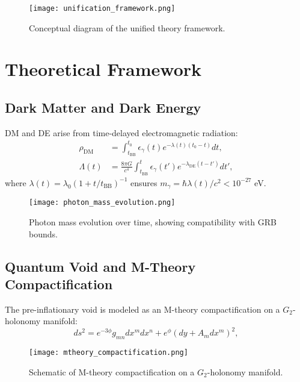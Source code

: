 \documentclass[12pt, a4paper]{article}
\begin{document}
\begin{figure}[h]
\centering
\texttt{[image: unification\_framework.png]}
\caption{Conceptual diagram of the unified theory framework.}
\label{fig:framework}
\end{figure}

\section{Theoretical Framework}

\subsection{Dark Matter and Dark Energy}

DM and DE arise from time-delayed electromagnetic radiation:
\begin{align}
\rho_{\text{DM}} &= \int_{t_{\text{BB}}}^{t_0} \epsilon_{\gamma}(t) e^{-\lambda(t)(t_0 - t)} dt, \label{eq:dm} \\
\Lambda(t) &= \frac{8\pi G}{c^4} \int_{t_{\text{BB}}}^{t} \epsilon_{\gamma}(t') e^{-\lambda_{\text{DE}}(t - t')} dt', \label{eq:de}
\end{align}
where \(\lambda(t) = \lambda_0 \left(1 + t/t_{\text{BB}}\right)^{-1}\) ensures \(m_\gamma = \hbar \lambda(t)/c^2 < 10^{-27}\) eV.

\begin{figure}[h]
\centering
\texttt{[image: photon\_mass\_evolution.png]}
\caption{Photon mass evolution over time, showing compatibility with GRB bounds.}
\label{fig:photon_mass}
\end{figure}

\subsection{Quantum Void and M-Theory Compactification}

The pre-inflationary void is modeled as an M-theory compactification on a \(G_2\)-holonomy manifold:
\begin{equation}
ds^2 = e^{-3\phi} g_{mn} dx^m dx^n + e^{\phi} (dy + A_m dx^m)^2, \label{eq:G2}
\end{equation}

\begin{figure}[h]
\centering
\texttt{[image: mtheory\_compactification.png]}
\caption{Schematic of M-theory compactification on a $G_2$-holonomy manifold.}
\label{fig:mtheory}
\end{figure}
\end{document}
